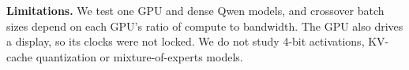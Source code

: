 \textbf{Limitations.} We test one GPU and dense Qwen models, and crossover batch sizes depend on
each GPU's ratio of compute to bandwidth. The GPU also drives a display,
so its clocks were not locked. We do not study 4-bit activations, KV-cache quantization or
mixture-of-experts models.
\label{sec:limits}
